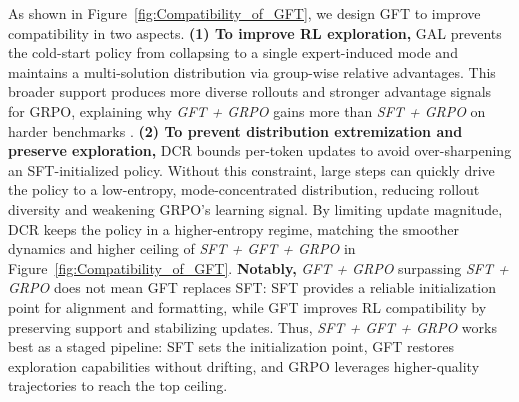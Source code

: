 As shown in Figure~\ref{fig:Compatibility_of_GFT}, we design GFT to improve compatibility in two aspects. \textbf{(1) To improve RL exploration,} GAL prevents the cold-start policy from collapsing to a single expert-induced mode and maintains a multi-solution distribution via group-wise relative advantages. This broader support produces more diverse rollouts and stronger advantage signals for GRPO, explaining why \textit{GFT + GRPO} gains more than \textit{SFT + GRPO} on harder benchmarks \cite{li2024preserving}. \textbf{(2) To prevent distribution extremization and preserve exploration,} DCR bounds per-token updates to avoid over-sharpening an SFT-initialized policy. Without this constraint, large steps can quickly drive the policy to a low-entropy, mode-concentrated distribution, reducing rollout diversity and weakening GRPO’s learning signal. By limiting update magnitude, DCR keeps the policy in a higher-entropy regime, matching the smoother dynamics and higher ceiling of \textit{SFT + GFT + GRPO} in Figure~\ref{fig:Compatibility_of_GFT}. \textbf{Notably,} \textit{GFT + GRPO} surpassing \textit{SFT + GRPO} does not mean GFT replaces SFT: SFT provides a reliable initialization point for alignment and formatting, while GFT improves RL compatibility by preserving support and stabilizing updates. Thus, \textit{SFT + GFT + GRPO} works best as a staged pipeline: SFT sets the initialization point, GFT restores exploration capabilities without drifting, and GRPO leverages higher-quality trajectories to reach the top ceiling.






